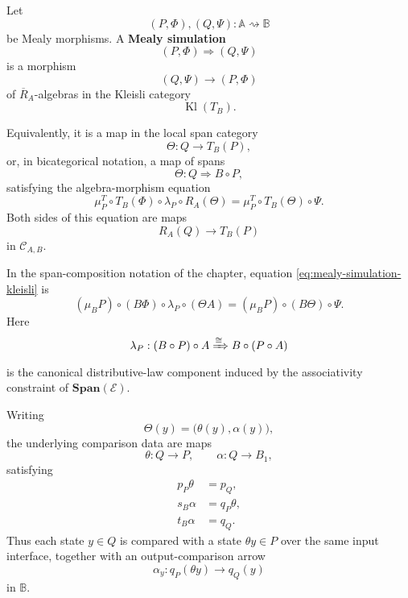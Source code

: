 \begin{definition}
\label{def:mealy-simulation}
    Let
    \[
        (P,\Phi),(Q,\Psi):\mathbb A\rightsquigarrow\mathbb B
    \]
    be Mealy morphisms. A \textbf{Mealy simulation}
    \[
        (P,\Phi)\Rightarrow(Q,\Psi)
    \]
    is a morphism
    \[
        (Q,\Psi)\to(P,\Phi)
    \]
    of \(\overline R_A\)-algebras in the Kleisli category
    \[
        \operatorname{Kl}(T_B).
    \]

    Equivalently, it is a map in the local span category
    \[
        \Theta:Q\to T_B(P),
    \]
    or, in bicategorical notation, a map of spans
    \[
        \Theta:Q\Rightarrow B\circ P,
    \]
    satisfying the algebra-morphism equation
    \begin{equation}
        \mu^T_P\circ
        T_B(\Phi)\circ
        \lambda_P\circ
        R_A(\Theta)
        =
        \mu^T_P\circ
        T_B(\Theta)\circ
        \Psi.
        \label{eq:mealy-simulation-kleisli}
    \end{equation}
    Both sides of this equation are maps
    \[
        R_A(Q)\to T_B(P)
    \]
    in \(\mathcal C_{A,B}\).

    In the span-composition notation of the chapter, equation
    \eqref{eq:mealy-simulation-kleisli} is
    \begin{equation}
        (\mu_B P)\circ
        (B\Phi)\circ
        \lambda_P\circ
        (\Theta A)
        =
        (\mu_B P)\circ
        (B\Theta)\circ
        \Psi.
        \label{eq:mealy-simulation-abstract}
    \end{equation}
    Here
    \[
        \lambda_P:
        (B\circ P)\circ A
        \xRightarrow{\cong}
        B\circ(P\circ A)
    \]
    is the canonical distributive-law component induced by the associativity constraint of \(\mathbf{Span}(\mathcal E)\).

    Writing
    \[
        \Theta(y)=\bigl(\theta(y),\alpha(y)\bigr),
    \]
    the underlying comparison data are maps
    \[
        \theta:Q\to P,
        \qquad
        \alpha:Q\to B_1,
    \]
    satisfying
    \begin{align}
        p_P\theta&=p_Q,
        \label{eq:mealy-simulation-input-interface}
        \\
        s_B\alpha&=q_P\theta,
        \label{eq:mealy-simulation-alpha-source}
        \\
        t_B\alpha&=q_Q.
        \label{eq:mealy-simulation-alpha-target}
    \end{align}
    Thus each state \(y\in Q\) is compared with a state \(\theta y\in P\) over the same input interface, together with an output-comparison arrow
    \[
        \alpha_y:q_P(\theta y)\to q_Q(y)
    \]
    in \(\mathbb B\).
\end{definition}

